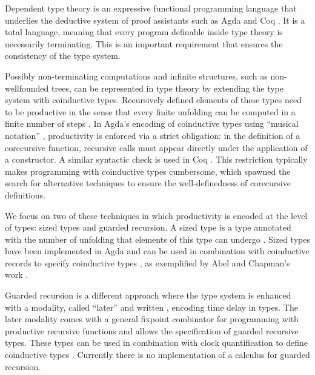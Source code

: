 Dependent type theory is an expressive functional programming
language that underlies the deductive system of proof assistants such
as Agda and Coq \cite{barras1997coq,norell}. It is a total language,
meaning that every program definable inside type theory is necessarily
terminating. This is an important requirement that ensures the
consistency of the type system. 

Possibly non-terminating computations
and infinite structures, such as non-wellfounded trees, can be
represented in type theory by extending the type system with
coinductive types. Recursively defined elements of these types
need to be productive in the sense that every
finite unfolding can be computed in a finite number of steps \cite{Coquand93}.
In Agda's encoding of coinductive types using ``musical notation''
\cite{DA10}, productivity is enforced via a strict obligation: in the
definition of a corecursive function, recursive
calls must appear directly under
the application of a constructor. A similar syntactic
check is used in Coq \cite{DBertotK08}.
This restriction
typically makes programming with coinductive types cumbersome,
which spawned the search for alternative techniques to ensure the
well-definedness of corecursive definitions.

We focus on two of these techniques in which productivity is encoded
at the level of types: sized types and guarded recursion. A sized type
 is a type annotated with the number of unfolding that
elements of this type can undergo \cite{Hughes96}. Sized types have been implemented
in Agda and can be used in
combination with coinductive records to specify
coinductive types \cite{Copatterns,AVW-normalization}, as exemplified
by Abel and Chapman's work \cite{AC14}.

Guarded recursion \cite{Nakano}
is a different approach where the type system is enhanced with a
modality, called ``later'' and written , encoding time delay in
types. The later modality comes with a general fixpoint combinator for
programming with productive recursive functions and allows the
specification of guarded recursive types.
These types can be used in combination with clock quantification to define  coinductive types \cite{atkey2013productive,BahrGM17}. Currently there is no
implementation of a calculus for guarded recursion.

